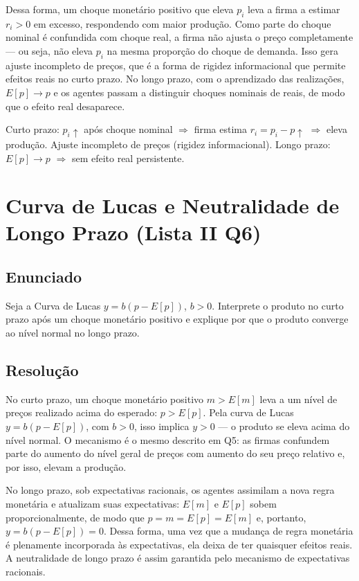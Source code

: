 \documentclass[12pt, a4paper]{article}
\begin{document}
Dessa forma, um choque monetário positivo que eleva $p_i$ leva a firma a estimar $r_i > 0$ em excesso, respondendo com maior produção. Como parte do choque nominal é confundida com choque real, a firma não ajusta o preço completamente --- ou seja, não eleva $p_i$ na mesma proporção do choque de demanda. Isso gera ajuste incompleto de preços, que é a forma de rigidez informacional que permite efeitos reais no curto prazo. No longo prazo, com o aprendizado das realizações, $E[p] \to p$ e os agentes passam a distinguir choques nominais de reais, de modo que o efeito real desaparece.

\begin{resultbox}[title={Lucas: Extração de Sinal (Lista II Q5)}]
Curto prazo: $p_i\uparrow$ após choque nominal $\Rightarrow$ firma estima $r_i = p_i - p\uparrow$ $\Rightarrow$ eleva produção. Ajuste incompleto de preços (rigidez informacional). Longo prazo: $E[p]\to p$ $\Rightarrow$ sem efeito real persistente.
\end{resultbox}

\section{Curva de Lucas e Neutralidade de Longo Prazo (Lista II Q6)}

\subsection*{Enunciado}
Seja a Curva de Lucas $y = b(p - E[p])$, $b>0$. Interprete o produto no curto prazo após um choque monetário positivo e explique por que o produto converge ao nível normal no longo prazo.

\subsection*{Resolução}

No curto prazo, um choque monetário positivo $m > E[m]$ leva a um nível de preços realizado acima do esperado: $p > E[p]$. Pela curva de Lucas $y = b(p - E[p])$, com $b > 0$, isso implica $y > 0$ --- o produto se eleva acima do nível normal. O mecanismo é o mesmo descrito em Q5: as firmas confundem parte do aumento do nível geral de preços com aumento do seu preço relativo e, por isso, elevam a produção.

No longo prazo, sob expectativas racionais, os agentes assimilam a nova regra monetária e atualizam suas expectativas: $E[m]$ e $E[p]$ sobem proporcionalmente, de modo que $p = m = E[p] = E[m]$ e, portanto, $y = b(p - E[p]) = 0$. Dessa forma, uma vez que a mudança de regra monetária é plenamente incorporada às expectativas, ela deixa de ter quaisquer efeitos reais. A neutralidade de longo prazo é assim garantida pelo mecanismo de expectativas racionais.
\end{document}

